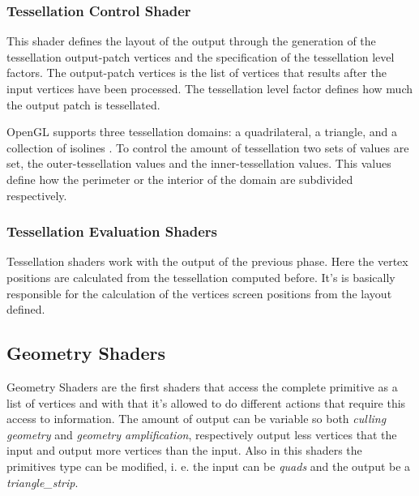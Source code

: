 \subsubsection{Tessellation Control Shader} %
\label{ssub:tesselation_control_shader}
	This shader defines the layout of the output through the generation of the tessellation output-patch vertices and the specification of the tessellation level factors. The output-patch vertices is the list of vertices that results after the input vertices have been processed. The tessellation level factor defines how much the output patch is tessellated. 

	OpenGL supports three tessellation domains: a quadrilateral, a triangle, and a collection of isolines \cite{shreiner2013opengl}. To control the amount of tessellation two sets of values are set, the outer-tessellation values and the inner-tessellation values. This values define how the perimeter or the interior of the domain are subdivided respectively. 


\subsubsection{Tessellation Evaluation Shaders} %
\label{ssub:tesselation_evaluation_shaders}
Tessellation shaders work with the output of the previous phase. Here the vertex positions are calculated from the tessellation computed before. It's is basically responsible for the calculation of the vertices screen positions from the layout defined.



\subsection{Geometry Shaders} %
\label{sub:geometriy_shaders}

Geometry Shaders are the first shaders that access the complete primitive as a list of vertices and with that it's allowed to do different actions that require this access to information. The amount of output can be variable so both \emph{culling geometry} and \emph{geometry amplification}, respectively output less vertices that the input and output more vertices than the input. Also in this shaders the primitives type can be modified, i. e. the input can be \emph{quads} and the output be a \emph{triangle\_strip}.

